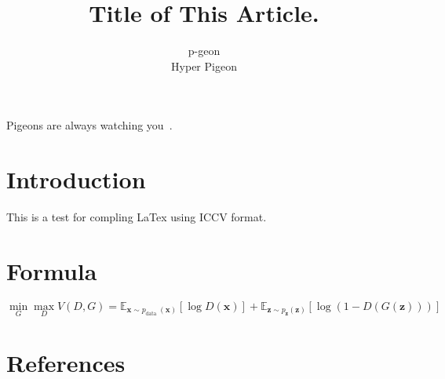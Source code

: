 \documentclass[10pt,twocolumn,letterpaper]{article}
\begin{document}
\title{Title of This Article.}

\author{
p-geon\\
Hyper Pigeon
}

\maketitle
\ificcvfinal\thispagestyle{empty}\fi

Pigeons are always watching you~\cite{bibtest}.

\section{Introduction}

This is a test for compling LaTex using ICCV format.

\section{Formula}



\[
    \min _{G} \max _{D} V(D, G)=\mathbb{E}_{\boldsymbol{x} \sim p_{\text {data }}(\boldsymbol{x})}[\log D(\boldsymbol{x})]+\mathbb{E}_{\boldsymbol{z} \sim p_{\boldsymbol{z}}(\boldsymbol{z})}[\log (1-D(G(\boldsymbol{z})))]
\]

\section{References}

{\small
% 


}
\end{document}
